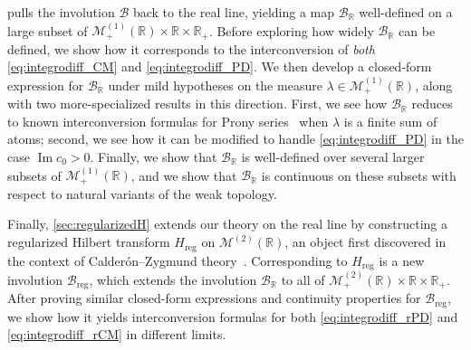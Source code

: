 \documentclass{cams-l} %
\newcommand{\dave}[1]{#1}\newcommand{\davebegin}{}\newcommand{\daveend}{}\newcommand{\george}[1]{#1}
\newcommand{\RR}{\mathbb R}
\newcommand{\cM}{\mathcal M}
\newcommand{\cB}{\mathcal B}
\newcommand{\op}{\operatorname}
\renewcommand{\Im}{\op{Im}}
\theoremstyle{definition}
\theoremstyle{remark}
\numberwithin{equation}{section}
\begin{document}
\dave{ pulls the involution $\cB$ back to the real line, yielding a map $\cB_\RR$ well-defined on a large subset of $\cM_+^{(1)}(\RR)\times\RR\times\RR_+$. Before exploring how widely $\cB_\RR$ can be defined, we show how it corresponds to the interconversion of \emph{both} \ref{eq:integrodiff_CM} and \ref{eq:integrodiff_PD}. We then develop a closed-form expression for $\cB_\RR$ under mild hypotheses on the measure $\lambda\in\cM_+^{(1)}(\RR)$, along with two more-specialized results in this direction. First, we see how $\cB_\RR$ reduces to known interconversion formulas for Prony series~\cite{tschoegl2012phenomenological,bhattacharya2023learning} when $\lambda$ is a finite sum of atoms; second, we see how it can be modified to handle \ref{eq:integrodiff_PD} in the case $\Im c_0>0$. Finally, we show that $\cB_\RR$ is well-defined over several larger subsets of $\cM_+^{(1)}(\RR)$, and we show that $\cB_\RR$ is continuous on these subsets with respect to natural variants of the weak topology.}

Finally, \cref{sec:regularizedH} extends our theory on the real line by constructing a regularized Hilbert transform $H_\mathrm{reg}$ \dave{on} $\cM^{(2)}(\RR)$, \dave{an object first discovered in the context of Calder\'on--Zygmund theory~\cite{10.1007/BF02392130}. Corresponding to $H_\mathrm{reg}$ is a new involution $\cB_\mathrm{reg}$, which extends the involution $\cB_\RR$ to all of $\cM_+^{(2)}(\RR)\times\RR\times\RR_+$.} After proving similar closed-form expressions and continuity properties for $\cB_\mathrm{reg}$, we show how it yields interconversion formulas for both \ref{eq:integrodiff_rPD} and \ref{eq:integrodiff_rCM} in different limits.
\end{document}

